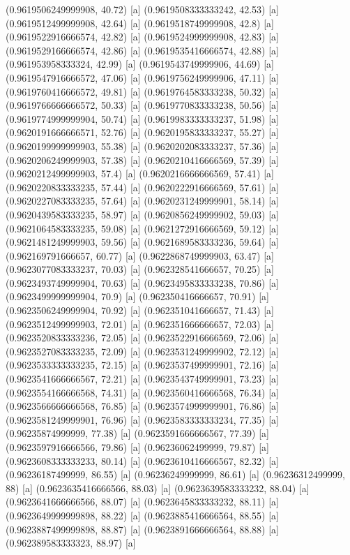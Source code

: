 {{{(0.9619506249999908, 40.72) [a] 
(0.9619508333333242, 42.53) [a] 
(0.9619512499999908, 42.64) [a] 
(0.9619518749999908, 42.8) [a] 
(0.9619522916666574, 42.82) [a] 
(0.9619524999999908, 42.83) [a] 
(0.9619529166666574, 42.86) [a] 
(0.9619535416666574, 42.88) [a] 
(0.961953958333324, 42.99) [a] 
(0.9619543749999906, 44.69) [a] 
(0.9619547916666572, 47.06) [a] 
(0.9619756249999906, 47.11) [a] 
(0.9619760416666572, 49.81) [a] 
(0.9619764583333238, 50.32) [a] 
(0.9619766666666572, 50.33) [a] 
(0.9619770833333238, 50.56) [a] 
(0.9619774999999904, 50.74) [a] 
(0.9619983333333237, 51.98) [a] 
(0.9620191666666571, 52.76) [a] 
(0.9620195833333237, 55.27) [a] 
(0.9620199999999903, 55.38) [a] 
(0.9620202083333237, 57.36) [a] 
(0.9620206249999903, 57.38) [a] 
(0.9620210416666569, 57.39) [a] 
(0.9620212499999903, 57.4) [a] 
(0.9620216666666569, 57.41) [a] 
(0.9620220833333235, 57.44) [a] 
(0.9620222916666569, 57.61) [a] 
(0.9620227083333235, 57.64) [a] 
(0.9620231249999901, 58.14) [a] 
(0.9620439583333235, 58.97) [a] 
(0.9620856249999902, 59.03) [a] 
(0.9621064583333235, 59.08) [a] 
(0.9621272916666569, 59.12) [a] 
(0.9621481249999903, 59.56) [a] 
(0.9621689583333236, 59.64) [a] 
(0.962169791666657, 60.77) [a] 
(0.9622868749999903, 63.47) [a] 
(0.9623077083333237, 70.03) [a] 
(0.962328541666657, 70.25) [a] 
(0.9623493749999904, 70.63) [a] 
(0.9623495833333238, 70.86) [a] 
(0.9623499999999904, 70.9) [a] 
(0.962350416666657, 70.91) [a] 
(0.9623506249999904, 70.92) [a] 
(0.962351041666657, 71.43) [a] 
(0.9623512499999903, 72.01) [a] 
(0.962351666666657, 72.03) [a] 
(0.9623520833333236, 72.05) [a] 
(0.9623522916666569, 72.06) [a] 
(0.9623527083333235, 72.09) [a] 
(0.9623531249999902, 72.12) [a] 
(0.9623533333333235, 72.15) [a] 
(0.9623537499999901, 72.16) [a] 
(0.9623541666666567, 72.21) [a] 
(0.9623543749999901, 73.23) [a] 
(0.9623554166666568, 74.31) [a] 
(0.9623560416666568, 76.34) [a] 
(0.9623566666666568, 76.85) [a] 
(0.9623574999999901, 76.86) [a] 
(0.9623581249999901, 76.96) [a] 
(0.9623583333333234, 77.35) [a] 
(0.96235874999999, 77.38) [a] 
(0.9623591666666567, 77.39) [a] 
(0.9623597916666566, 79.86) [a] 
(0.96236062499999, 79.87) [a] 
(0.9623608333333233, 80.14) [a] 
(0.9623610416666567, 82.32) [a] 
(0.96236187499999, 86.55) [a] 
(0.96236249999999, 86.61) [a] 
(0.96236312499999, 88) [a] 
(0.9623635416666566, 88.03) [a] 
(0.9623639583333232, 88.04) [a] 
(0.9623641666666566, 88.07) [a] 
(0.9623645833333232, 88.11) [a] 
(0.9623649999999898, 88.22) [a] 
(0.9623885416666564, 88.55) [a] 
(0.9623887499999898, 88.87) [a] 
(0.9623891666666564, 88.88) [a] 
(0.962389583333323, 88.97) [a] 
}}}
